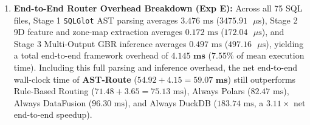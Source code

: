 \documentclass[10pt,a4paper]{article}
\begin{document}
\begin{enumerate}[leftmargin=1.5em,itemsep=2pt]
    \item \textbf{End-to-End Router Overhead Breakdown (Exp E):} Across all 75 SQL files, Stage 1 \texttt{SQLGlot} AST parsing averages $3.476\text{ ms}$ ($3475.91\text{ }\mu\text{s}$), Stage 2 9D feature and zone-map extraction averages $0.172\text{ ms}$ ($172.04\text{ }\mu\text{s}$), and Stage 3 Multi-Output GBR inference averages $0.497\text{ ms}$ ($497.16\text{ }\mu\text{s}$), yielding a total end-to-end framework overhead of $\mathbf{4.145\text{ ms}}$ ($7.55\%$ of mean execution time). Including this full parsing and inference overhead, the net end-to-end wall-clock time of \textbf{AST-Route} ($54.92 + 4.15 = \mathbf{59.07\text{ ms}}$) still outperforms Rule-Based Routing ($71.48 + 3.65 = 75.13\text{ ms}$), Always Polars ($82.47\text{ ms}$), Always DataFusion ($96.30\text{ ms}$), and Always DuckDB ($183.74\text{ ms}$, a $\mathbf{3.11\times}$ net end-to-end speedup).
\end{enumerate}
\end{document}
